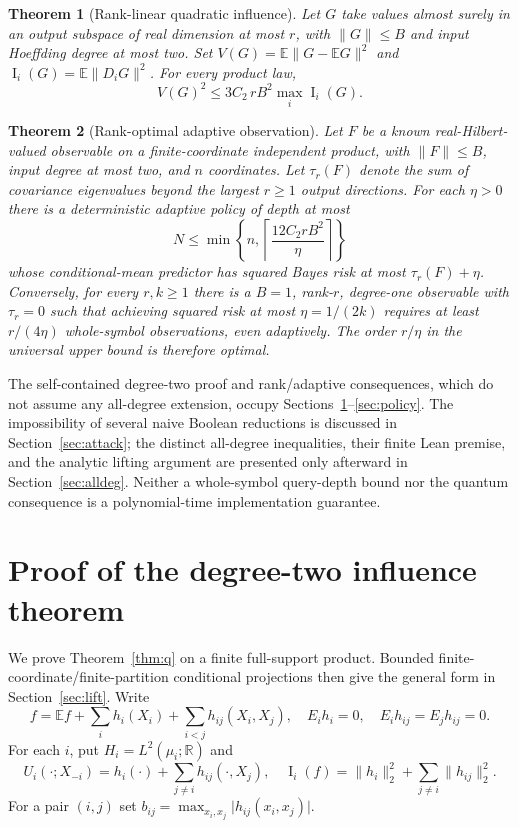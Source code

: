 \documentclass[11pt,letterpaper]{article}
\newtheorem{theorem}{Theorem}[section]
\theoremstyle{definition}\newtheorem{definition}[theorem]{Definition}
\newcommand{\E}{\mathbb E}
\newcommand{\Inf}{\operatorname{I}}
\newcommand{\Ctwo}{C_2}
\newcommand{\abs}[1]{\lvert #1\rvert}
\newcommand{\norm}[1]{\lVert #1\rVert}
\begin{document}
\begin{theorem}[Rank-linear quadratic influence]\label{thm:r}
Let $G$ take values almost surely in an output subspace of real dimension at most $r$, with $\norm G\le B$ and input Hoeffding degree at most two. Set
$V(G)=\E\norm{G-\E G}^2$ and $\Inf_i(G)=\E\norm{D_iG}^2$.
For every product law,
\begin{equation}\label{eq:R}
\boxed{\displaystyle V(G)^2\le 3\Ctwo\,rB^2\max_i\Inf_i(G).}
\end{equation}
\end{theorem}

\begin{theorem}[Rank-optimal adaptive observation]\label{thm:obs}
Let $F$ be a known real-Hilbert-valued observable on a \emph{finite-coordinate} independent product, with $\norm F\le B$, input degree at most two, and $n$ coordinates. Let $\tau_r(F)$ denote the sum of covariance eigenvalues beyond the largest $r\ge1$ output directions. For each $\eta>0$ there is a deterministic adaptive policy of depth at most
\begin{equation}\label{eq:depth}
\boxed{\displaystyle N\le\min\left\{n,\left\lceil\frac{12\Ctwo rB^2}{\eta}\right\rceil\right\}}
\end{equation}
whose conditional-mean predictor has squared Bayes risk at most $\tau_r(F)+\eta$. Conversely, for every $r,k\ge1$ there is a $B=1$, rank-$r$, degree-one observable with $\tau_r=0$ such that achieving squared risk at most $\eta=1/(2k)$ requires at least $r/(4\eta)$ whole-symbol observations, even adaptively. The order $r/\eta$ in the universal upper bound is therefore optimal.
\end{theorem}

The self-contained degree-two proof and rank/adaptive consequences, which do not assume any all-degree extension, occupy Sections~\ref{sec:quad}--\ref{sec:policy}. The impossibility of several naive Boolean reductions is discussed in Section~\ref{sec:attack}; the distinct all-degree inequalities, their finite Lean premise, and the analytic lifting argument are presented only afterward in Section~\ref{sec:alldeg}. Neither a whole-symbol query-depth bound nor the quantum consequence is a polynomial-time implementation guarantee.

\section{Proof of the degree-two influence theorem}\label{sec:quad}
We prove Theorem~\ref{thm:q} on a finite full-support product. Bounded finite-coordinate/finite-partition conditional projections then give the general form in Section~\ref{sec:lift}. Write
\begin{equation}\label{eq:dec}
f=\E f+\sum_i h_i(X_i)+\sum_{i<j}h_{ij}(X_i,X_j),\quad
E_i h_i=0,\quad E_i h_{ij}=E_jh_{ij}=0.
\end{equation}
For each $i$, put $H_i=L^2(\mu_i;\mathbb R)$ and
\begin{equation}\label{eq:ui}
U_i(\cdot;X_{-i})=h_i(\cdot)+\sum_{j\ne i}h_{ij}(\cdot,X_j),\quad
\Inf_i(f)=\norm{h_i}_2^2+\sum_{j\ne i}\norm{h_{ij}}_2^2.
\end{equation}
For a pair $(i,j)$ set $b_{ij}=\max_{x_i,x_j}\abs{h_{ij}(x_i,x_j)}$.
\end{document}
